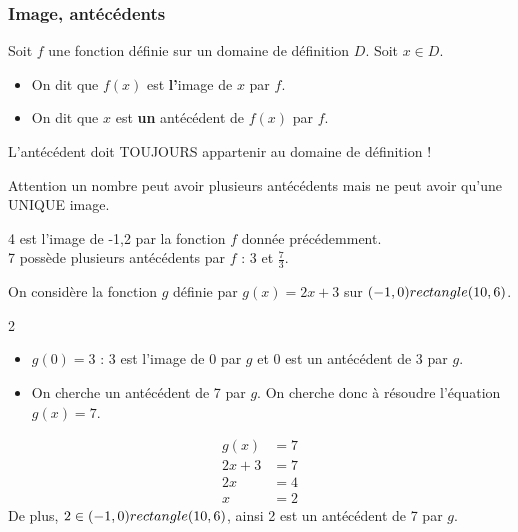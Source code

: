 \subsubsection{Image, antécédents}

\begin{Définition} 
Soit $f$ une fonction définie sur un domaine de définition $D$. Soit $x \in D$.

\begin{itemize}[label=\textcolor{Couleur6}{$\bullet$}]
    \item On dit que $f(x)$ est \textbf{l'}image de $x$ par $f$.
    \item On dit que $x$ est \textbf{un} antécédent de $f(x)$ par $f$.
\end{itemize}
\end{Définition}

L'antécédent doit TOUJOURS appartenir au domaine de définition !
\vspace{0.5cm}
\begin{Remarque}
Attention un nombre peut avoir plusieurs antécédents mais ne peut avoir qu'une UNIQUE image.
\end{Remarque}
\vspace{0.5cm}
\begin{Exemple} 
4 est l'image de -1,2 par la fonction $f$ donnée précédemment.\\
7 possède plusieurs antécédents par $f$ : 3 et $\frac{7}{3}$.
\end{Exemple}

\begin{Exemple}
On considère la fonction $g$ définie par $g(x) = 2x + 3$ sur $(-1,0) rectangle (10,6)$.
\begin{multicols}{2}
\begin{itemize}[label=\textcolor{Couleur10}{$\bullet$}]
    \item $g(0) = 3$ : 3 est l'image de 0 par $g$ et 0 est un antécédent de 3 par $g$.
    
    \item On cherche un antécédent de 7 par $g$. On cherche donc à résoudre l'équation $g(x) = 7$.
\end{itemize}
    \columnbreak
    \vspace{-0.5cm}
\begin{align*}
g(x) &= 7 \\
2x + 3 &= 7 \\
2x &= 4 \\
x &= 2
\end{align*}
De plus, $2 \in (-1,0) rectangle (10,6)$, ainsi 2 est un antécédent de 7 par $g$.
\end{multicols}
\end{Exemple}

